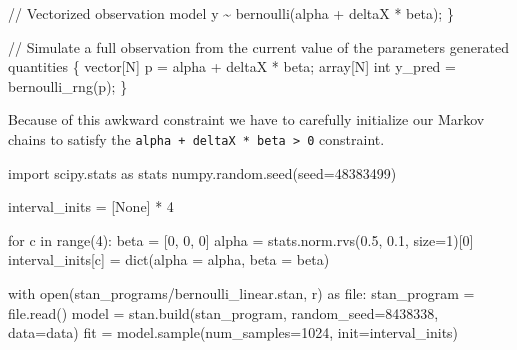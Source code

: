 \documentclass[
  letterpaper,
  DIV=11,
  numbers=noendperiod]{scrartcl}
\newenvironment{Shaded}{\begin{snugshade}}{\end{snugshade}}
\newcommand{\BuiltInTok}[1]{\textcolor[rgb]{0.00,0.23,0.31}{#1}}
\newcommand{\CommentTok}[1]{\textcolor[rgb]{0.37,0.37,0.37}{#1}}
\newcommand{\ControlFlowTok}[1]{\textcolor[rgb]{0.00,0.23,0.31}{#1}}
\newcommand{\DataTypeTok}[1]{\textcolor[rgb]{0.68,0.00,0.00}{#1}}
\newcommand{\DecValTok}[1]{\textcolor[rgb]{0.68,0.00,0.00}{#1}}
\newcommand{\FloatTok}[1]{\textcolor[rgb]{0.68,0.00,0.00}{#1}}
\newcommand{\ImportTok}[1]{\textcolor[rgb]{0.00,0.46,0.62}{#1}}
\newcommand{\KeywordTok}[1]{\textcolor[rgb]{0.00,0.23,0.31}{#1}}
\newcommand{\NormalTok}[1]{\textcolor[rgb]{0.00,0.23,0.31}{#1}}
\newcommand{\OperatorTok}[1]{\textcolor[rgb]{0.37,0.37,0.37}{#1}}
\newcommand{\StringTok}[1]{\textcolor[rgb]{0.13,0.47,0.30}{#1}}
\newcommand{\VariableTok}[1]{\textcolor[rgb]{0.07,0.07,0.07}{#1}}
\begin{document}
\begin{codelisting}
\begin{Shaded}
\begin{Highlighting}[]
  \CommentTok{// Vectorized observation model}
\NormalTok{  y \textasciitilde{} bernoulli(alpha + deltaX * beta);}
\NormalTok{\}}

\CommentTok{// Simulate a full observation from the current value of the parameters}
\KeywordTok{generated quantities}\NormalTok{ \{}
  \DataTypeTok{vector}\NormalTok{[N] p = alpha + deltaX * beta;}
  \DataTypeTok{array}\NormalTok{[N] }\DataTypeTok{int}\NormalTok{ y\_pred = bernoulli\_rng(p);}
\NormalTok{\}}
\end{Highlighting}
\end{Shaded}

\end{codelisting}

Because of this awkward constraint we have to carefully initialize our
Markov chains to satisfy the
\texttt{alpha\ +\ deltaX\ *\ beta\ \textgreater{}\ 0} constraint.

\begin{Shaded}
\begin{Highlighting}[]
\ImportTok{import}\NormalTok{ scipy.stats }\ImportTok{as}\NormalTok{ stats}
\NormalTok{numpy.random.seed(seed}\OperatorTok{=}\DecValTok{48383499}\NormalTok{)}

\NormalTok{interval\_inits }\OperatorTok{=}\NormalTok{ [}\VariableTok{None}\NormalTok{] }\OperatorTok{*} \DecValTok{4}

\ControlFlowTok{for}\NormalTok{ c }\KeywordTok{in} \BuiltInTok{range}\NormalTok{(}\DecValTok{4}\NormalTok{):}
\NormalTok{  beta }\OperatorTok{=}\NormalTok{ [}\DecValTok{0}\NormalTok{, }\DecValTok{0}\NormalTok{, }\DecValTok{0}\NormalTok{]}
\NormalTok{  alpha }\OperatorTok{=}\NormalTok{ stats.norm.rvs(}\FloatTok{0.5}\NormalTok{, }\FloatTok{0.1}\NormalTok{, size}\OperatorTok{=}\DecValTok{1}\NormalTok{)[}\DecValTok{0}\NormalTok{]}
\NormalTok{  interval\_inits[c] }\OperatorTok{=} \BuiltInTok{dict}\NormalTok{(alpha }\OperatorTok{=}\NormalTok{ alpha, beta }\OperatorTok{=}\NormalTok{ beta)}
\end{Highlighting}
\end{Shaded}

\begin{Shaded}
\begin{Highlighting}[]
\ControlFlowTok{with} \BuiltInTok{open}\NormalTok{(}\StringTok{\textquotesingle{}stan\_programs/bernoulli\_linear.stan\textquotesingle{}}\NormalTok{, }\StringTok{\textquotesingle{}r\textquotesingle{}}\NormalTok{) }\ImportTok{as} \BuiltInTok{file}\NormalTok{:}
\NormalTok{  stan\_program }\OperatorTok{=} \BuiltInTok{file}\NormalTok{.read()}
\NormalTok{model }\OperatorTok{=}\NormalTok{ stan.build(stan\_program, random\_seed}\OperatorTok{=}\DecValTok{8438338}\NormalTok{, data}\OperatorTok{=}\NormalTok{data)}
\NormalTok{fit }\OperatorTok{=}\NormalTok{ model.sample(num\_samples}\OperatorTok{=}\DecValTok{1024}\NormalTok{, init}\OperatorTok{=}\NormalTok{interval\_inits)}
\end{Highlighting}
\end{Shaded}
\end{document}
